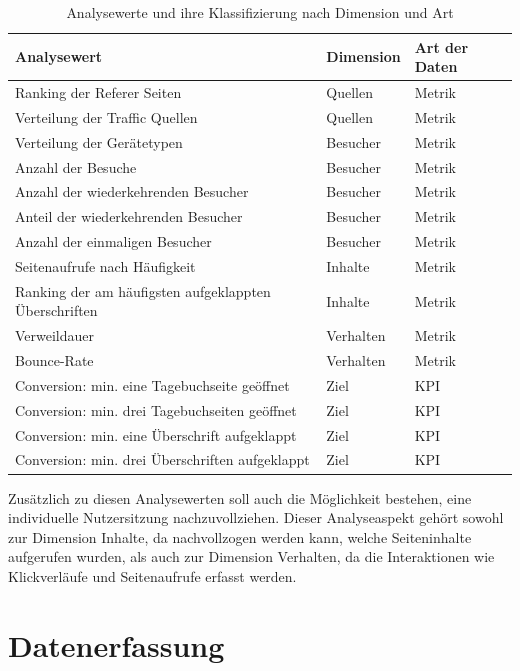 \begin{table}[H]
    \centering
    \begin{tabularx}{\textwidth}{l l l}
        \hline
        \textbf{Analysewert} & \textbf{Dimension} & \textbf{Art der Daten} \\
        \hline
        Ranking der Referer Seiten & Quellen & Metrik \\
        Verteilung der Traffic Quellen & Quellen & Metrik \\
        Verteilung der Gerätetypen & Besucher & Metrik \\
        Anzahl der Besuche & Besucher & Metrik \\
        Anzahl der wiederkehrenden Besucher & Besucher & Metrik \\
        Anteil der wiederkehrenden Besucher & Besucher & Metrik \\
        Anzahl der einmaligen Besucher & Besucher & Metrik \\
        Seitenaufrufe nach Häufigkeit & Inhalte & Metrik \\
        Ranking der am häufigsten aufgeklappten Überschriften & Inhalte & Metrik \\
        Verweildauer & Verhalten & Metrik \\
        Bounce-Rate & Verhalten & Metrik \\
        Conversion: min. eine Tagebuchseite geöffnet & Ziel & KPI \\
        Conversion: min. drei Tagebuchseiten geöffnet & Ziel & KPI \\
        Conversion: min. eine Überschrift aufgeklappt & Ziel & KPI \\
        Conversion: min. drei Überschriften aufgeklappt & Ziel & KPI \\
        \hline
    \end{tabularx}
    \caption{Analysewerte und ihre Klassifizierung nach Dimension und Art}
    \label{tab:analysewerte}
\end{table}

Zusätzlich zu diesen Analysewerten soll auch die Möglichkeit bestehen, eine individuelle Nutzersitzung nachzuvollziehen. Dieser Analyseaspekt gehört sowohl zur Dimension Inhalte, da nachvollzogen werden kann, welche Seiteninhalte aufgerufen wurden, als auch zur Dimension Verhalten, da die Interaktionen wie Klickverläufe und Seitenaufrufe erfasst werden.

\section{Datenerfassung}
\label{sec:Datenerfassung}
